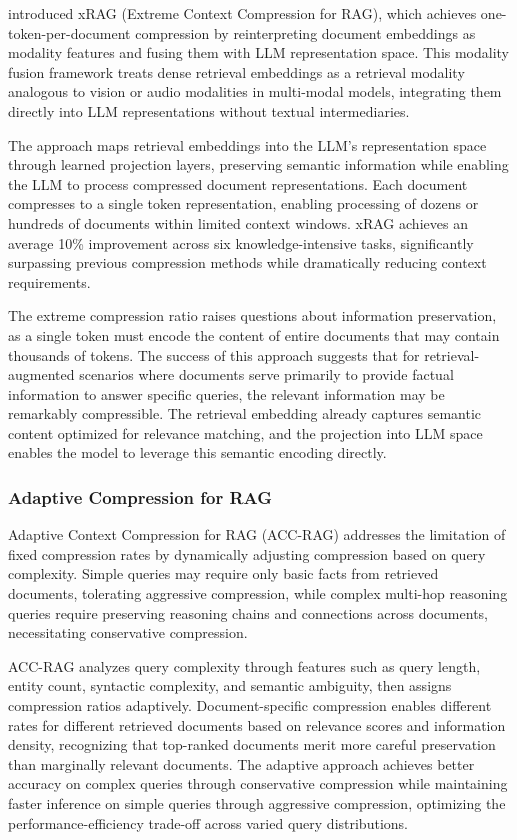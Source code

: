 \citet{xrag2024} introduced xRAG (Extreme Context Compression for RAG), which achieves one-token-per-document compression by reinterpreting document embeddings as modality features and fusing them with LLM representation space. This modality fusion framework treats dense retrieval embeddings as a retrieval modality analogous to vision or audio modalities in multi-modal models, integrating them directly into LLM representations without textual intermediaries.

The approach maps retrieval embeddings into the LLM's representation space through learned projection layers, preserving semantic information while enabling the LLM to process compressed document representations. Each document compresses to a single token representation, enabling processing of dozens or hundreds of documents within limited context windows. xRAG achieves an average 10\% improvement across six knowledge-intensive tasks, significantly surpassing previous compression methods while dramatically reducing context requirements.

The extreme compression ratio raises questions about information preservation, as a single token must encode the content of entire documents that may contain thousands of tokens. The success of this approach suggests that for retrieval-augmented scenarios where documents serve primarily to provide factual information to answer specific queries, the relevant information may be remarkably compressible. The retrieval embedding already captures semantic content optimized for relevance matching, and the projection into LLM space enables the model to leverage this semantic encoding directly.

\subsubsection{Adaptive Compression for RAG}

Adaptive Context Compression for RAG (ACC-RAG) addresses the limitation of fixed compression rates by dynamically adjusting compression based on query complexity. Simple queries may require only basic facts from retrieved documents, tolerating aggressive compression, while complex multi-hop reasoning queries require preserving reasoning chains and connections across documents, necessitating conservative compression.

ACC-RAG analyzes query complexity through features such as query length, entity count, syntactic complexity, and semantic ambiguity, then assigns compression ratios adaptively. Document-specific compression enables different rates for different retrieved documents based on relevance scores and information density, recognizing that top-ranked documents merit more careful preservation than marginally relevant documents. The adaptive approach achieves better accuracy on complex queries through conservative compression while maintaining faster inference on simple queries through aggressive compression, optimizing the performance-efficiency trade-off across varied query distributions.

